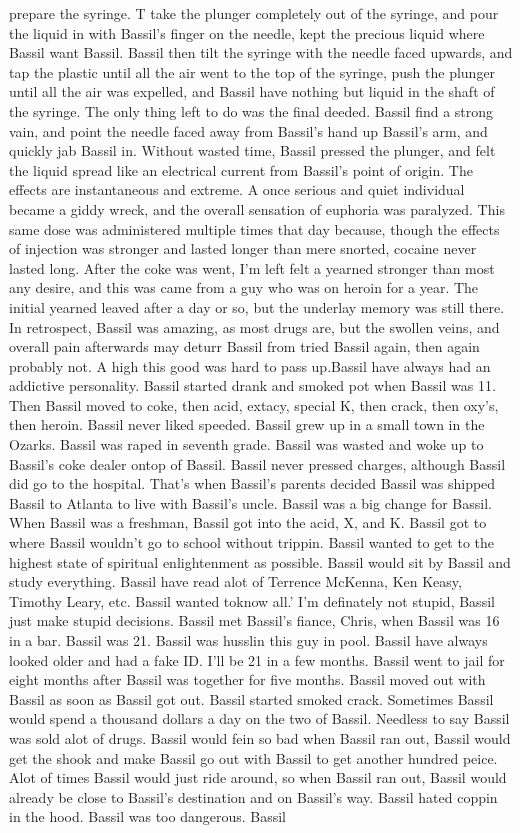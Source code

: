 \documentclass[12pt]{book}
\begin{document}
prepare the syringe. T take the plunger completely out of the syringe, and pour the liquid in with Bassil's finger on the needle, kept the precious liquid where Bassil want Bassil. Bassil then tilt the syringe with the needle faced upwards, and tap the plastic until all the air went to the top of the syringe, push the plunger until all the air was expelled, and Bassil have nothing but liquid in the shaft of the syringe. The only thing left to do was the final deeded. Bassil find a strong vain, and point the needle faced away from Bassil's hand up Bassil's arm, and quickly jab Bassil in. Without wasted time, Bassil pressed the plunger, and felt the liquid spread like an electrical current from Bassil's point of origin. The effects are instantaneous and extreme. A once serious and quiet individual became a giddy wreck, and the overall sensation of euphoria was paralyzed. This same dose was administered multiple times that day because, though the effects of injection was stronger and lasted longer than mere snorted, cocaine never lasted long. After the coke was went, I'm left felt a yearned stronger than most any desire, and this was came from a guy who was on heroin for a year. The initial yearned leaved after a day or so, but the underlay memory was still there. In retrospect, Bassil was amazing, as most drugs are, but the swollen veins, and overall pain afterwards may deturr Bassil from tried Bassil again, then again probably not. A high this good was hard to pass up.Bassil have always had an addictive personality. Bassil started drank and smoked pot when Bassil was 11. Then Bassil moved to coke, then acid, extacy, special K, then crack, then oxy's, then heroin. Bassil never liked speeded. Bassil grew up in a small town in the Ozarks. Bassil was raped in seventh grade. Bassil was wasted and woke up to Bassil's coke dealer ontop of Bassil. Bassil never pressed charges, although Bassil did go to the hospital. That's when Bassil's parents decided Bassil was shipped Bassil to Atlanta to live with Bassil's uncle. Bassil was a big change for Bassil. When Bassil was a freshman, Bassil got into the acid, X, and K. Bassil got to where Bassil wouldn't go to school without trippin. Bassil wanted to get to the highest state of spiritual enlightenment as possible. Bassil would sit by Bassil and study everything. Bassil have read alot of Terrence McKenna, Ken Keasy, Timothy Leary, etc. Bassil wanted toknow all.' I'm definately not stupid, Bassil just make stupid decisions. Bassil met Bassil's fiance, Chris, when Bassil was 16 in a bar. Bassil was 21. Bassil was husslin this guy in pool. Bassil have always looked older and had a fake ID. I'll be 21 in a few months. Bassil went to jail for eight months after Bassil was together for five months. Bassil moved out with Bassil as soon as Bassil got out. Bassil started smoked crack. Sometimes Bassil would spend a thousand dollars a day on the two of Bassil. Needless to say Bassil was sold alot of drugs. Bassil would fein so bad when Bassil ran out, Bassil would get the shook and make Bassil go out with Bassil to get another hundred peice. Alot of times Bassil would just ride around, so when Bassil ran out, Bassil would already be close to Bassil's destination and on Bassil's way. Bassil hated coppin in the hood. Bassil was too dangerous. Bassil 
\end{document}
